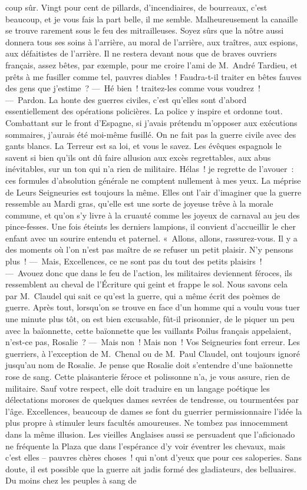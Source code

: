 \documentclass[french,twoside]{book} %
\begin{document}
coup sûr. Vingt pour cent de pillards, d’incendiaires, de bourreaux, c’est beaucoup, et je vous fais la part belle, il me semble. Malheureusement la canaille se trouve rarement sous le feu des mitrailleuses. Soyez sûrs que la nôtre aussi donnera tous ses soins à l’arrière, au moral de l’arrière, aux traîtres, aux espions, aux défaitistes de l’arrière. Il ne restera devant nous que de braves ouvriers français, assez bêtes, par exemple, pour me croire l’ami de M. André Tardieu, et prêts à me fusiller comme tel, pauvres diables ! Faudra-t-il traiter en bêtes fauves des gens que j’estime ? — Hé bien ! traitez-les comme vous voudrez ! — Pardon. La honte des guerres civiles, c’est qu’elles sont d’abord essentiellement des opérations policières. La police y inspire et ordonne tout. Combattant sur le front d’Espagne, si j’avais prétendu m’opposer aux exécutions sommaires, j’aurais été moi-même fusillé. On ne fait pas la guerre civile avec des gants blancs. La Terreur est sa loi, et vous le savez. Les évêques espagnols le savent si bien qu’ils ont dû faire allusion aux excès regrettables, aux abus inévitables, sur un ton qui n’a rien de militaire. Hélas ! je regrette de l’avouer : ces formules d’absolution générale ne comptent nullement à mes yeux. La méprise de Leurs Seigneuries est toujours la même. Elles ont l’air d’imaginer que la guerre ressemble au Mardi gras, qu’elle est une sorte de joyeuse trêve à la morale commune, et qu’on s’y livre à la cruauté comme les joyeux de carnaval au jeu des pince-fesses. Une fois éteints les derniers lampions, il convient d’accueillir le cher enfant avec un sourire entendu et paternel. « Allons, allons, rassurez-vous. Il y a des moments où l’on n’est pas maître de se refuser un petit plaisir. N’y pensons plus ! — Mais, Excellences, ce ne sont pas du tout des petits plaisirs ! — Avouez donc que dans le feu de l’action, les militaires deviennent féroces, ils ressemblent au cheval de l’Écriture qui geint et frappe le sol. Nous savons cela par M. Claudel qui sait ce qu’est la guerre, qui a même écrit des poèmes de guerre. Après tout, lorsqu’on se trouve en face d’un homme qui a voulu vous tuer une minute plus tôt, on est bien excusable, fût-il prisonnier, de le piquer un peu avec la baïonnette, cette baïonnette que les vaillants Poilus français appelaient, n’est-ce pas, Rosalie ? — Mais non ! Mais non ! Vos Seigneuries font erreur. Les guerriers, à l’exception de M. Chenal ou de M. Paul Claudel, ont toujours ignoré jusqu’au nom de Rosalie. Je pense que Rosalie doit s’entendre d’une baïonnette rose de sang. Cette plaisanterie féroce et polissonne n’a, je vous assure, rien de militaire. Sauf votre respect, elle doit traduire en un langage poétique les délectations moroses de quelques dames sevrées de tendresse, ou tourmentées par l’âge. Excellences, beaucoup de dames se font du guerrier permissionnaire l’idée la plus propre à stimuler leurs facultés amoureuses. Ne tombez pas innocemment dans la même illusion. Les vieilles Anglaises aussi se persuadent que l’aficionado ne fréquente la Plaza que dans l’espérance d’y voir éventrer les chevaux, mais c’est elles – pauvres chères choses ! qui n’ont d’yeux que pour ces saloperies. Sans doute, il est possible que la guerre ait jadis formé des gladiateurs, des belluaires. Du moins chez les peuples à sang de 
\end{document}

